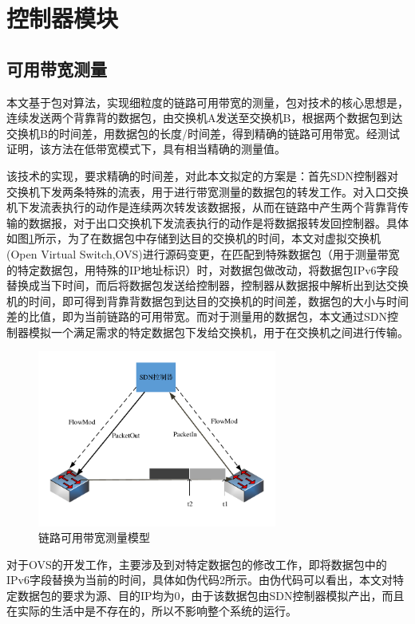 \section{控制器模块}
\subsection{可用带宽测量}
本文基于包对算法，实现细粒度的链路可用带宽的测量，包对技术的核心思想是，连续发送两个背靠背的数据包，由交换机A发送至交换机B，根据两个数据包到达交换机B的时间差，用数据包的长度/时间差，得到精确的链路可用带宽。经测试证明，该方法在低带宽模式下，具有相当精确的测量值。

该技术的实现，要求精确的时间差，对此本文拟定的方案是：首先SDN控制器对交换机下发两条特殊的流表，用于进行带宽测量的数据包的转发工作。对入口交换机下发流表执行的动作是连续两次转发该数据报，从而在链路中产生两个背靠背传输的数据报，对于出口交换机下发流表执行的动作是将数据报转发回控制器。具体如图\ref{fig:spaceband}所示，为了在数据包中存储到达目的交换机的时间，本文对虚拟交换机
(Open Virtual Switch,OVS)进行源码变更，在匹配到特殊数据包（用于测量带宽的特定数据包，用特殊的IP地址标识）时，对数据包做改动，将数据包IPv6字段替换成当下时间，而后将数据包发送给控制器，控制器从数据报中解析出到达交换机的时间，即可得到背靠背数据包到达目的交换机的时间差，数据包的大小与时间差的比值，即为当前链路的可用带宽。而对于测量用的数据包，本文通过SDN控制器模拟一个满足需求的特定数据包下发给交换机，用于在交换机之间进行传输。

\begin{figure}[!htb]
  \centering
  \includegraphics[width=0.7\textwidth]{logo/spaceband}
  \caption{链路可用带宽测量模型}
  \label{fig:spaceband}
\end{figure}

对于OVS的开发工作，主要涉及到对特定数据包的修改工作，即将数据包中的IPv6字段替换为当前的时间，具体如伪代码2所示。由伪代码可以看出，本文对特定数据包的要求为源、目的IP均为0，由于该数据包由SDN控制器模拟产出，而且在实际的生活中是不存在的，所以不影响整个系统的运行。

